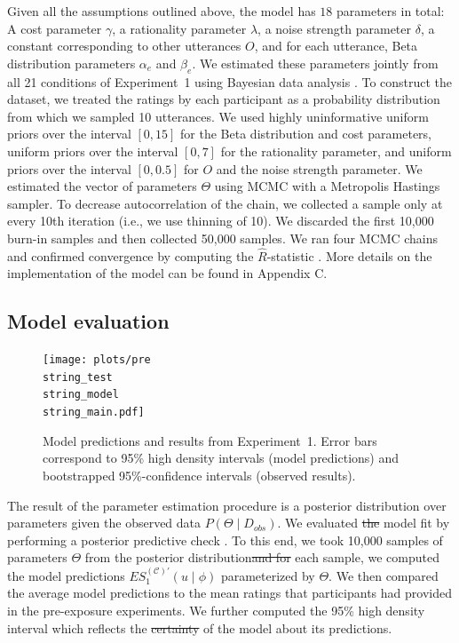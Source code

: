\documentclass[man, floatsintext]{apa6}
\providecommand{\DIFadd}[1]{{\protect\color{blue}\uwave{#1}}} %
\providecommand{\DIFdel}[1]{{\protect\color{red}\sout{#1}}}                      %
\providecommand{\DIFaddbegin}{} %
\providecommand{\DIFaddend}{} %
\providecommand{\DIFdelbegin}{} %
\providecommand{\DIFdelend}{} %
\newcommand{\DIFscaledelfig}{0.5}
\newlength{\DIFdelgraphicswidth} %
\newlength{\DIFdelgraphicsheight} %
\newcommand{\DIFaddincludegraphics}[2][]{{\color{blue}\fbox{\DIFOincludegraphics[#1]{#2}}}} %
\newcommand{\DIFdelincludegraphics}[2][]{%
\sbox{\DIFdelgraphicsbox}{\DIFOincludegraphics[#1]{#2}}%
\settoboxwidth{\DIFdelgraphicswidth}{\DIFdelgraphicsbox} %
\settoboxtotalheight{\DIFdelgraphicsheight}{\DIFdelgraphicsbox} %
\scalebox{\DIFscaledelfig}{%
\parbox[b]{\DIFdelgraphicswidth}{\usebox{\DIFdelgraphicsbox}\\[-\baselineskip] \rule{\DIFdelgraphicswidth}{0em}}\llap{\resizebox{\DIFdelgraphicswidth}{\DIFdelgraphicsheight}{%
\setlength{\unitlength}{\DIFdelgraphicswidth}%
\begin{picture}(1,1)%
\thicklines\linethickness{2pt} %
{\color[rgb]{1,0,0}\put(0,0){\framebox(1,1){}}}%
{\color[rgb]{1,0,0}\put(0,0){\line( 1,1){1}}}%
{\color[rgb]{1,0,0}\put(0,1){\line(1,-1){1}}}%
\end{picture}%
}\hspace*{3pt}}} %
} %
\DeclareRobustCommand{\DIFaddbegin}{\DIFOaddbegin \let\includegraphics\DIFaddincludegraphics} %
\DeclareRobustCommand{\DIFaddend}{\DIFOaddend \let\includegraphics\DIFOincludegraphics} %
\DeclareRobustCommand{\DIFdelbegin}{\DIFOdelbegin \let\includegraphics\DIFdelincludegraphics} %
\DeclareRobustCommand{\DIFdelend}{\DIFOaddend \let\includegraphics\DIFOincludegraphics} %
\begin{document}
Given all the assumptions outlined above, the model has  $18$ parameters in total: A cost parameter $\gamma$, a rationality parameter $\lambda$, a noise strength parameter $\delta$, a constant corresponding to other utterances $O$, and for each utterance, Beta distribution parameters $\alpha_e$ and $\beta_e$. We estimated these parameters jointly from all 21 conditions of Experiment~1 using Bayesian data analysis \parencite[BDA; see, e.g.,][]{Kruschke2015}. To construct the dataset, we treated the ratings by each participant as a probability distribution from which we sampled 10 utterances. We used highly uninformative
uniform priors over the interval $[0,15]$ for the Beta distribution and cost parameters, uniform priors over the interval $[0,7]$ for the rationality parameter, and uniform priors over the interval $[0,0.5]$ for $O$ and the noise strength parameter. We estimated the vector of parameters $\Theta$ using MCMC with a Metropolis Hastings sampler. To decrease autocorrelation of the chain, we collected a sample only at every 10th iteration (i.e., we use thinning of 10). We discarded the first 10,000 burn-in samples and then collected 50,000 samples.  We ran four MCMC chains and confirmed convergence by computing the $\hat{R}$-statistic \parencite{Gelman2003}. More details on the implementation of the model can be found in Appendix C.

\subsection{Model evaluation}



\begin{figure}[th!]
\texttt{[image: plots/pre\\string\_test\\string\_model\\string\_main.pdf]}
\caption{Model predictions and results from Experiment~1. Error bars correspond to 95\% high density intervals (model predictions) and bootstrapped 95\%-confidence intervals (observed results). \label{fig:norming-results-model-main}}

\end{figure}


The result of the parameter estimation procedure is a posterior distribution over parameters given the observed data $P(\Theta \mid D_{obs})$. We evaluated
 \DIFdelbegin \DIFdel{the }\DIFdelend model fit by performing a posterior predictive check \parencite[PPC;][]{Kruschke2015}. To this end, we took 10,000 samples of parameters $\Theta$ from the posterior distribution\DIFdelbegin \DIFdel{and for }\DIFdelend \DIFaddbegin \DIFadd{. For }\DIFaddend each sample, we computed the model predictions $ES_1^{(\mathscr{C})'}(u \mid \phi)$ parameterized by $\Theta$. We then compared the average model predictions to the
mean ratings that participants had provided in the pre-exposure experiments. We further computed the 95\% high density interval  \parencite[HDI;][]{Kruschke2015} which reflects the \DIFdelbegin \DIFdel{certainty }\DIFdelend \DIFaddbegin \DIFadd{ctertainty }\DIFaddend of the model
about its predictions.
\end{document}
